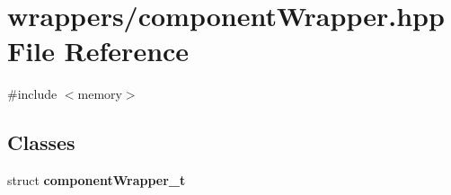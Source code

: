 \section{wrappers/component\+Wrapper.hpp File Reference}
\label{component_wrapper_8hpp}
{\ttfamily \#include $<$memory$>$}\newline
\subsection*{Classes}
\begin{DoxyCompactItemize}
\item 
struct \textbf{ component\+Wrapper\+\_\+t}
\end{DoxyCompactItemize}
